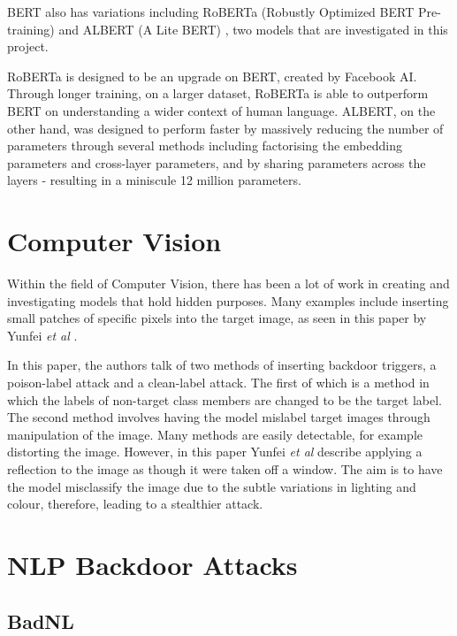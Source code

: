 BERT also has variations including RoBERTa (Robustly Optimized BERT Pre-training) \cite{RoBERTa} and ALBERT (A Lite BERT) \cite{ALBERT}, two models that are investigated in this project. 

RoBERTa is designed to be an upgrade on BERT, created by Facebook AI. Through longer training, on a larger dataset, RoBERTa is able to outperform BERT on understanding a wider context of human language. ALBERT, on the other hand, was designed to perform faster by massively reducing the number of parameters through several methods including factorising the embedding parameters and cross-layer parameters, and by sharing parameters across the layers - resulting in a miniscule 12 million parameters.

\section{Computer Vision}

Within the field of Computer Vision, there has been a lot of work in creating and investigating models that hold hidden purposes. Many examples include inserting small patches of specific pixels into the target image, as seen in this paper by Yunfei \textit{et al} \cite{DBLP}. 

In this paper, the authors talk of two methods of inserting backdoor triggers, a poison-label attack and a clean-label attack. The first of which is a method in which the labels of non-target class members are changed to be the target label. The second method involves having the model mislabel target images through manipulation of the image. Many methods are easily detectable, for example distorting the image. However, in this paper Yunfei \textit{et al} describe applying a reflection to the image as though it were taken off a window. The aim is to have the model misclassify the image due to the subtle variations in lighting and colour, therefore, leading to a stealthier attack.

\section{NLP Backdoor Attacks}

\subsection{BadNL}
